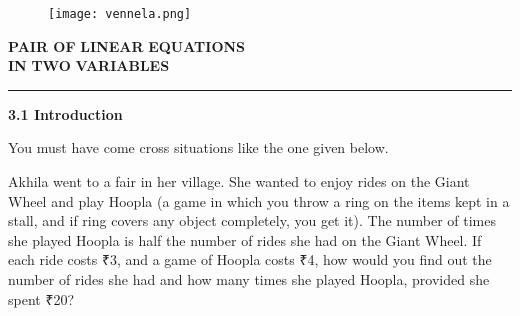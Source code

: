 \documentclass{article}
\begin{document}
\begin{figure}[h]
    \centering
    \texttt{[image: vennela.png]}
\end{figure}
\begin{flushleft}
    \hspace{2em}
    {\color{ncertcyan}\fontsize{35pt}{30pt}\selectfont\textbf P\color{ncertcyan}\fontsize{22pt}{22pt}\selectfont\textbf {AIR OF}
    \color{ncertcyan}\fontsize{35pt}{30pt}\selectfont\textbf L\color{ncertcyan}\fontsize{22pt}{22pt}\selectfont\textbf {INEAR}
    \color{ncertcyan}\fontsize{35pt}{30pt}\selectfont\textbf E\color{ncertcyan}\fontsize{22pt}{22pt}\selectfont\textbf {QUATIONS}
    \vspace{0.5em}
    \\
    \hspace*{5.7em}
    \color{ncertcyan}\fontsize{22pt}{22pt}\selectfont\textbf {IN}
    \color{ncertcyan}\fontsize{35pt}{30pt}\selectfont\textbf T\color{ncertcyan}\fontsize{20pt}{20pt}\selectfont\textbf {WO}
    \color{ncertcyan}\fontsize{35pt}{30pt}\selectfont\textbf V\color{ncertcyan}\fontsize{22pt}{22pt}\selectfont\textbf {ARIABLES} }
    \end{flushleft}
\vspace{-2em}

\vspace{-6em}
\begin{flushright}
\end{flushright}


\vspace{-2em}
\noindent\textcolor{ncertcyan}{\rule{\linewidth}{5pt}}

\vspace{2em}
{ \noindent\color{ncertcyan}\fontsize{10pt}{10pt}\selectfont\textbf {3.1 Introduction}}
\vspace{0.5em}

{\fontsize{13}{16}\selectfont
\noindent
You must have come cross situations like the one given below.

\vspace{1em}
\hspace{1em}
Akhila went to a fair in her village. She wanted to enjoy rides on the Giant Wheel and play Hoopla (a game in which you throw a ring on the items kept in a stall, and if ring covers any object completely, you get it). The number of times she played Hoopla is half the number of rides she had on the Giant Wheel. If each ride costs  ₹3, and a game of Hoopla costs ₹4, how would you find out the number of rides she had and how many times she played Hoopla, provided she spent ₹20?
}
\end{document}
